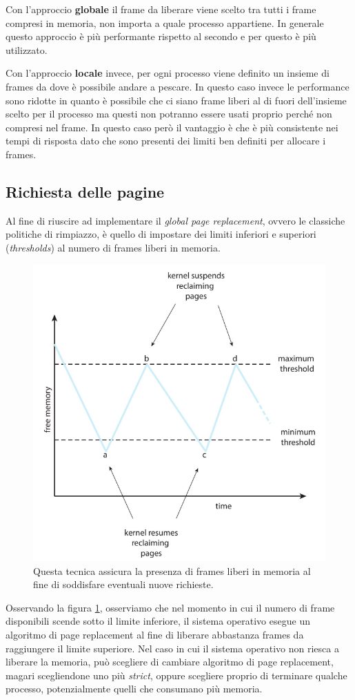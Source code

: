 Con l'approccio \textbf{globale} il frame da liberare viene scelto tra tutti i frame compresi in memoria, non importa a quale processo appartiene. In generale questo approccio è più performante rispetto al secondo e per questo è più utilizzato. 

Con l'approccio \textbf{locale} invece, per ogni processo viene definito un insieme di frames da dove è possibile andare a pescare. In questo caso invece le performance sono ridotte in quanto è possibile che ci siano frame liberi al di fuori dell'insieme scelto per il processo ma questi non potranno essere usati proprio perché non compresi nel frame. In questo caso però il vantaggio è che è più consistente nei tempi di risposta dato che sono presenti dei limiti ben definiti per allocare i frames. 

% 
\subsection{Richiesta delle pagine}
Al fine di riuscire ad implementare il \textit{global page replacement}, ovvero le classiche politiche di rimpiazzo, è quello di impostare dei limiti inferiori e superiori (\textit{thresholds}) al numero di frames liberi in memoria.
\begin{figure}[h]
    \centering
    \includegraphics[width = .5\textwidth]{../res/imgs/virtual memory/reclaming_pages.png}
    \caption{Questa tecnica assicura la presenza di frames liberi in memoria al fine di soddisfare eventuali nuove richieste.} 
    \label{fig:reclaming_pages}
\end{figure}
Osservando la figura \ref{fig:reclaming_pages}, osserviamo che nel momento in cui il numero di frame disponibili scende sotto il limite inferiore, il sistema operativo esegue un algoritmo di page replacement al fine di liberare abbastanza frames da raggiungere il limite superiore. Nel caso in cui il sistema operativo non riesca a liberare la memoria, può scegliere di cambiare algoritmo di page replacement, magari scegliendone uno più \textit{strict}, oppure scegliere proprio di terminare qualche processo, potenzialmente quelli che consumano più memoria.

